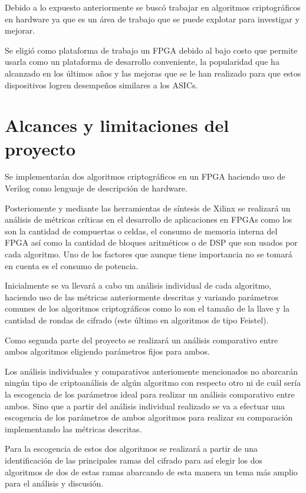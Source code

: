 Debido a lo expuesto anteriormente se buscó trabajar en algoritmos criptográficos en hardware ya que es un área de trabajo que se puede explotar para investigar y mejorar.

Se eligió como plataforma de trabajo un FPGA debido al bajo costo que permite usarla como un plataforma de desarrollo conveniente, la popularidad que ha alcanzado en los últimos años y las mejoras que se le han realizado para que estos dispositivos logren desempeños similares a los ASICs.

\section{Alcances y limitaciones del proyecto}
Se implementarán dos algoritmos criptográficos en un FPGA haciendo uso de Verilog como lenguaje de descripción de hardware. 

Posteriomente y mediante las herramientas de síntesis de Xilinx se realizará un análisis de métricas críticas en el desarrollo de aplicaciones en FPGAs como los son la cantidad de compuertas o celdas, el consumo de memoria interna del FPGA así como la cantidad de bloques aritméticos o de DSP que son usados por cada algoritmo. Uno de los factores que aunque tiene importancia no se tomará en cuenta es el consumo de potencia.

Inicialmente se va llevará a cabo un análisis individual de cada algoritmo, haciendo uso de las métricas anteriormente descritas y variando parámetros comunes de los algoritmos criptográficos como lo son el tamaño de la llave y la cantidad de rondas de cifrado (este último en algoritmos de tipo Feistel). 

Como segunda parte del proyecto se realizará un análisis comparativo entre ambos algoritmos eligiendo parámetros fijos para ambos.

Los análisis individuales y comparativos anteriomente mencionados no abarcarán ningún tipo de criptoanálisis de algún algoritmo con respecto otro ni de cuál sería la escogencia de los parámetros ideal para realizar un análisis comparativo entre ambos. Sino que a partir del análisis individual realizado se va a efectuar una escogencia de los parámetros de ambos algoritmos para realizar su comparación implementando las métricas descritas.

Para la escogencia de estos dos algoritmos se realizará a partir de una identificación de las principales ramas del cifrado para así elegir los dos algoritmos de dos de estas ramas abarcando de esta manera un tema más amplio para el análisis y discusión.

